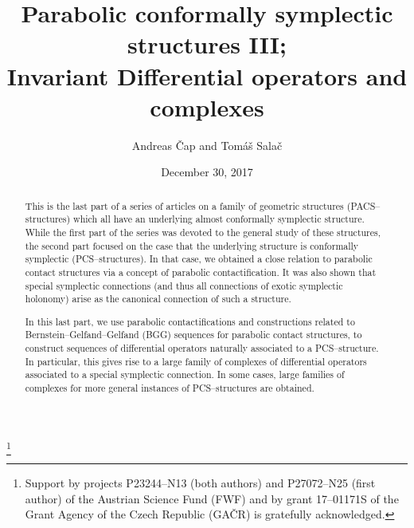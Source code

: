 \documentclass[12pt,a4paper]{amsart}
\numberwithin{theorem}{section}
\theoremstyle{definition}
\theoremstyle{remark}
\begin{document}
\title{Parabolic conformally symplectic structures III;\\
Invariant Differential operators and complexes} 
\date{December 30, 2017}
\author{Andreas \v Cap and Tom\'a\v s Sala\v c}
\thanks{Support by projects P23244--N13 (both authors) and P27072--N25 
  (first author) of the Austrian Science Fund (FWF) and by grant
  17--01171S of the Grant Agency of the Czech Republic (GA\v CR) is
  gratefully acknowledged.}

\address{A.\v C.: Faculty of Mathematics\\
University of Vienna\\
Oskar--Morgenstern--Platz 1\\
1090 Wien\\
Austria}
\address{T.S.: Mathematical Institute\\ Charles University\\ Sokolovsk\'a
  83\\Praha\\Czech Republic}

\begin{abstract}
  This is the last part of a series of articles on a family of
  geometric structures (PACS--structures) which all have an underlying
  almost conformally symplectic structure. While the first part of the
  series was devoted to the general study of these structures, the
  second part focused on the case that the underlying structure is
  conformally symplectic (PCS--structures). In that case, we obtained
  a close relation to parabolic contact structures via a concept of
  parabolic contactification. It was also shown that special
  symplectic connections (and thus all connections of exotic
  symplectic holonomy) arise as the canonical connection of such a
  structure.

  In this last part, we use parabolic contactifications and
  constructions related to Bernstein--Gelfand--Gelfand (BGG) sequences
  for parabolic contact structures, to construct sequences of
  differential operators naturally associated to a PCS--structure. In
  particular, this gives rise to a large family of complexes of
  differential operators associated to a special symplectic
  connection. In some cases, large families of complexes for more
  general instances of PCS--structures are obtained. 
\end{abstract}


\end{document}
